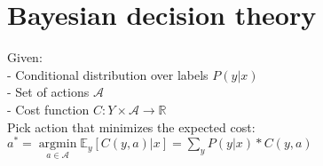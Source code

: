\section*{Bayesian decision theory}
Given:\\
- Conditional distribution over labels $P(y|x)$\\
- Set of actions $\mathcal{A}$\\
- Cost function $C:Y\times \mathcal{A} \rightarrow \mathbb{R}$\\
Pick action that minimizes the expected cost:
$a^* = \underset{a \in \mathcal{A}}{\operatorname{argmin}} \mathbb{E}_y[C(y,a)|x] = \sum_y P(y|x) * C(y,a)$ 


